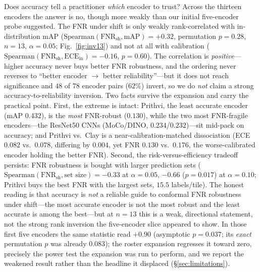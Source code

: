 \documentclass[journal]{IEEEtran}
\renewcommand{\_}{\textunderscore\allowbreak}
\begin{document}
Does accuracy tell a practitioner \emph{which} encoder to trust? Across the thirteen encoders the answer
is no, though more weakly than our initial five-encoder probe suggested. The FNR under shift is only
weakly rank-correlated with in-distribution mAP
($\mathrm{Spearman}(\mathrm{FNR}_{\mathrm{sh}},\mathrm{mAP})=+0.32$, permutation $p{=}0.28$, $n{=}13$,
$\alpha{=}0.05$; Fig.~\ref{fig:inv13}) and not at all with calibration
($\mathrm{Spearman}(\mathrm{FNR}_{\mathrm{sh}},\mathrm{ECE}_{\mathrm{in}})=-0.16$, $p{=}0.60$). The
correlation is \emph{positive}---higher accuracy never buys better FNR robustness, and the ordering never
reverses to ``better encoder $\to$ better reliability''---but it does not reach significance and $48$ of
$78$ encoder pairs ($62\%$) invert, so we do \emph{not} claim a strong accuracy-to-reliability inversion.
Two facts survive the expansion and carry the practical point. First, the extreme is intact: Prithvi, the
least accurate encoder (mAP $0.432$), is the \emph{most} FNR-robust ($0.130$), while the two most
FNR-fragile encoders---the ResNet50 CNNs (MoCo/DINO, $0.234$/$0.232$)---sit mid-pack on accuracy; and
Prithvi vs.\ Clay is a near-calibration-matched dissociation (ECE $0.082$ vs.\ $0.078$, differing by
$0.004$, yet FNR $0.130$ vs.\ $0.176$, the worse-calibrated encoder holding the better FNR). Second, the
risk-versus-efficiency tradeoff persists: FNR robustness is bought with larger prediction sets
($\mathrm{Spearman}(\mathrm{FNR}_{\mathrm{sh}},\text{set size})=-0.33$ at $\alpha{=}0.05$, $-0.66$
($p{=}0.017$) at $\alpha{=}0.10$; Prithvi buys the best FNR with the largest sets, $15.5$ labels/tile).
The honest reading is that accuracy is \emph{not} a reliable guide to conformal FNR robustness under
shift---the most accurate encoder is not the most robust and the least accurate is among the best---but at
$n{=}13$ this is a weak, directional statement, not the strong rank inversion the five-encoder slice
appeared to show. In those first five encoders the same statistic read $+0.90$ (asymptotic $p{=}0.037$;
its \emph{exact} permutation $p$ was already $0.083$); the roster expansion regresses it toward zero,
precisely the power test the expansion was run to perform, and we report the weakened result rather than
the headline it displaced (\S\ref{sec:limitations}).
\end{document}
